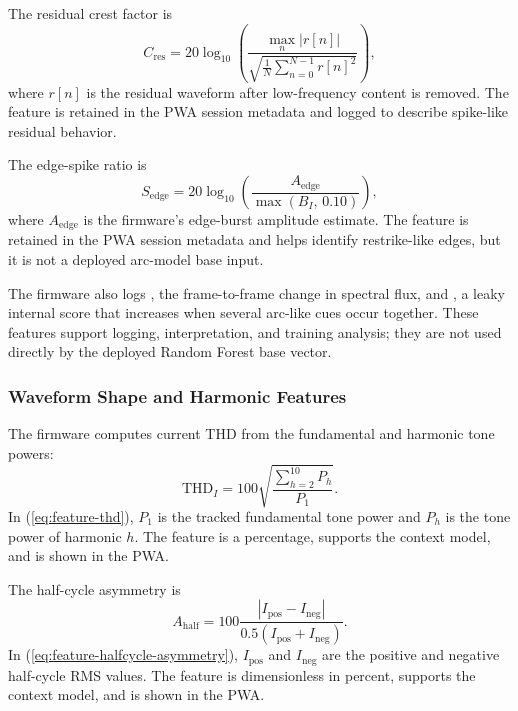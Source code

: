 The residual crest factor is
\begin{equation}
  C_{\mathrm{res}} =
  20\log_{10}
  \left(
  \frac{\max_n |r[n]|}{\sqrt{\frac{1}{N}\sum_{n=0}^{N-1}r[n]^2}}
  \right),
  \label{eq:feature-residual-crest}
\end{equation}
where $r[n]$ is the residual waveform after low-frequency content is removed.
The feature  is retained in the PWA session
metadata and logged to describe spike-like residual behavior.

The edge-spike ratio is
\begin{equation}
  S_{\mathrm{edge}} =
  20\log_{10}
  \left(
  \frac{A_{\mathrm{edge}}}{\max(B_I,\,0.10)}
  \right),
  \label{eq:feature-edge-spike}
\end{equation}
where $A_{\mathrm{edge}}$ is the firmware's edge-burst amplitude estimate.
The feature  is retained in the PWA session metadata
and helps identify restrike-like edges, but it is not a deployed arc-model
base input.

The firmware also logs , the frame-to-frame change in
spectral flux, and , a leaky internal score
that increases when several arc-like cues occur together. These features
support logging, interpretation, and training analysis; they are not used
directly by the deployed Random Forest base vector.

\subsubsection{Waveform Shape and Harmonic Features}
\label{sec:ch3-shape-harmonic-features}

The firmware computes current THD from the fundamental and harmonic tone
powers:
\begin{equation}
  \mathrm{THD}_I =
  100\sqrt{\frac{\sum_{h=2}^{10}P_h}{P_1}} .
  \label{eq:feature-thd}
\end{equation}
In (\ref{eq:feature-thd}), $P_1$ is the tracked fundamental tone power and
$P_h$ is the tone power of harmonic $h$. The feature  is a
percentage, supports the context model, and is shown in the PWA.

The half-cycle asymmetry is
\begin{equation}
  A_{\mathrm{half}} =
  100\frac{|I_{\mathrm{pos}}-I_{\mathrm{neg}}|}
  {0.5(I_{\mathrm{pos}}+I_{\mathrm{neg}})}.
  \label{eq:feature-halfcycle-asymmetry}
\end{equation}
In (\ref{eq:feature-halfcycle-asymmetry}), $I_{\mathrm{pos}}$ and
$I_{\mathrm{neg}}$ are the positive and negative half-cycle RMS values. The
feature  is dimensionless in percent, supports
the context model, and is shown in the PWA.

